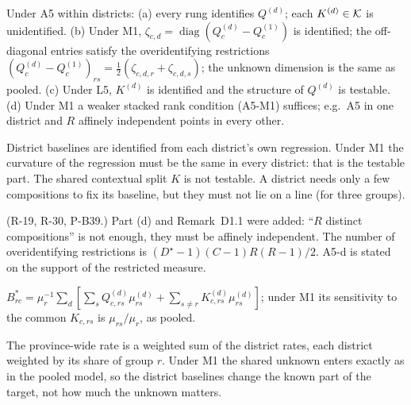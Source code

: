 \begin{result}\label{res:d1}
 Under A5 within districts: (a) every rung identifies
$Q^{(d)}$; each $K^{(d)}\in\mathcal K$ is unidentified. (b) Under M1,
$\zeta_{c,d}=\operatorname{diag}(Q^{(d)}_c-Q^{(1)}_c)$ is identified; the off-diagonal entries
satisfy the overidentifying restrictions
$(Q^{(d)}_c-Q^{(1)}_c)_{rs}=\tfrac12(\zeta_{c,d,r}+\zeta_{c,d,s})$; the unknown
dimension is the same as pooled. (c) Under L5, $K^{(d)}$ is identified and the
structure of $Q^{(d)}$ is testable. (d) Under M1 a weaker stacked rank condition
(A5-M1) suffices; e.g.\ A5 in one district and $R$ affinely independent points in
every other.
\end{result}
\begin{plain}
District baselines are identified from each district's own regression. Under M1
the curvature of the regression must be the same in every district: that is the
testable part. The shared contextual split $K$ is not testable. A district
needs only a few compositions to fix its baseline, but they must not lie on a
line (for three groups).
\end{plain}
\begin{revnote}
(R-19, R-30, P-B39.) Part (d) and Remark~D1.1 were added: ``$R$ distinct
compositions'' is not enough, they must be affinely independent. The number of
overidentifying restrictions is $(D^\star-1)(C-1)R(R-1)/2$. A5-d is stated on
the support of the restricted measure.
\end{revnote}

\begin{result}
 $B^*_{rc}=\mu_r^{-1}\sum_d[\sum_sQ^{(d)}_{c,rs}\mu^{(d)}_{rs}+\sum_{s\ne
r}K^{(d)}_{c,rs}\mu^{(d)}_{rs}]$; under M1 its sensitivity to the common $K_{c,rs}$
is $\mu_{rs}/\mu_r$, as pooled.
\end{result}
\begin{plain}
The province-wide rate is a weighted sum of the district rates, each district
weighted by its share of group $r$. Under M1 the shared unknown enters exactly as
in the pooled model, so the district baselines change the known part of the
target, not how much the unknown matters.
\end{plain}

